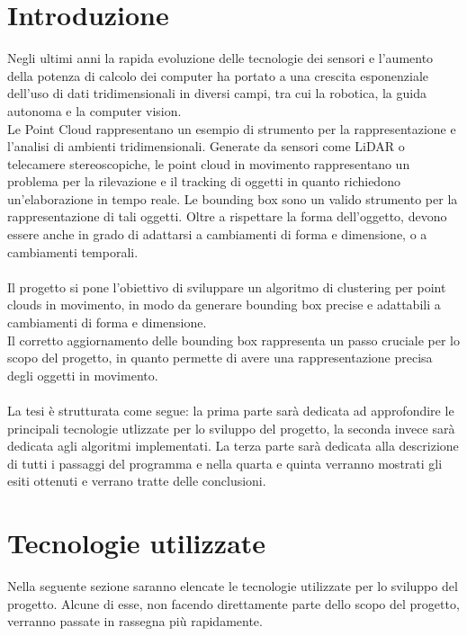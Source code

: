 \documentclass[italian]{report}
\begin{document}
\chapter*{Introduzione}
Negli ultimi anni la rapida evoluzione delle tecnologie dei sensori e l'aumento della potenza di calcolo dei computer ha portato a una crescita esponenziale dell'uso di dati tridimensionali in diversi campi, tra cui la robotica, la  guida autonoma e la computer vision.\\
Le Point Cloud rappresentano un esempio di strumento per la rappresentazione e l'analisi di ambienti tridimensionali. Generate da sensori come LiDAR o telecamere stereoscopiche, le point cloud in movimento rappresentano un problema per la rilevazione e il tracking di oggetti in quanto richiedono un'elaborazione in tempo reale. Le bounding box sono un valido strumento per la rappresentazione di tali oggetti. Oltre a rispettare la forma dell'oggetto, devono essere anche in grado di adattarsi a cambiamenti di forma e dimensione, o a cambiamenti temporali.\\
\\
Il progetto si pone l'obiettivo di sviluppare un algoritmo di clustering per point clouds in movimento, in modo da generare bounding box precise e adattabili a cambiamenti di forma e dimensione.\\
Il corretto aggiornamento delle bounding box rappresenta un passo cruciale per lo scopo del progetto, in quanto permette di avere una rappresentazione precisa degli oggetti in movimento.\\
\\
La tesi è strutturata come segue: la prima parte sarà dedicata ad approfondire le principali tecnologie utlizzate per lo sviluppo del progetto, la seconda invece sarà dedicata agli algoritmi implementati. La terza parte sarà dedicata alla descrizione di tutti i passaggi del programma e nella quarta e quinta verranno mostrati gli esiti ottenuti e verrano tratte delle conclusioni.
\newpage

\chapter{Tecnologie utilizzate}
Nella seguente sezione saranno elencate le tecnologie utilizzate per lo sviluppo del progetto. Alcune di esse, non facendo direttamente parte dello scopo del progetto, verranno passate in rassegna più rapidamente.
\end{document}
